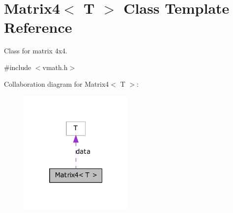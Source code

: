 \hypertarget{class_matrix4}{
\section{Matrix4$<$ T $>$ Class Template Reference}
\label{class_matrix4}
}


Class for matrix 4x4.  




{\ttfamily \#include $<$vmath.h$>$}



Collaboration diagram for Matrix4$<$ T $>$:\nopagebreak
\begin{figure}[H]
\begin{center}
\leavevmode
\includegraphics[width=160pt]{class_matrix4__coll__graph}
\end{center}
\end{figure}
